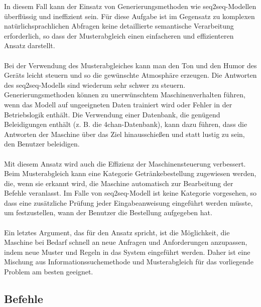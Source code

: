 In diesem Fall kann der Einsatz von Generierungsmethoden wie seq2seq-Modellen überflüssig und ineffizient sein.
Für diese Aufgabe ist im Gegensatz zu komplexen natürlichsprachlichen Abfragen keine detaillierte semantische Verarbeitung erforderlich, so dass der Musterabgleich einen einfacheren und effizienteren Ansatz darstellt.\\\\
Bei der Verwendung des Musterabgleiches kann man den Ton und den Humor des Geräts leicht steuern und so die gewünschte Atmosphäre erzeugen.
Die Antworten des seq2seq-Modells sind wiederum sehr schwer zu steuern.
Generierungsmethoden können zu unerwünschtem Maschinenverhalten führen, wenn das Modell auf ungeeigneten Daten trainiert wird oder Fehler in der Betriebslogik enthält.
Die Verwendung einer Datenbank, die genügend Beleidigungen enthält (z. B. die 4chan-Datenbank), kann dazu führen, dass die Antworten der Maschine über das Ziel hinausschießen und statt lustig zu sein, den Benutzer beleidigen.\\\\
Mit diesem Ansatz wird auch die Effizienz der Maschinensteuerung verbessert.
Beim Musterabgleich kann eine Kategorie \glqq{}Getränkebestellung\grqq{} zugewiesen werden, die, wenn sie erkannt wird, die Maschine automatisch zur Bearbeitung der Befehle veranlasst.
Im Falle von seq2seq-Modell ist keine Kategorie vorgesehen, so dass eine zusätzliche Prüfung jeder Eingabeanweisung eingeführt werden müsste, um festzustellen, wann der Benutzer die Bestellung aufgegeben hat.\\\\
Ein letztes Argument, das für den Ansatz spricht, ist die Möglichkeit, die Maschine bei Bedarf schnell an neue Anfragen und Anforderungen anzupassen, indem neue Muster und Regeln in das System eingeführt werden.
Daher ist eine Mischung aus Informationssuchemethode und Musterabgleich für das vorliegende Problem am besten geeignet.
\subsection{Befehle}
